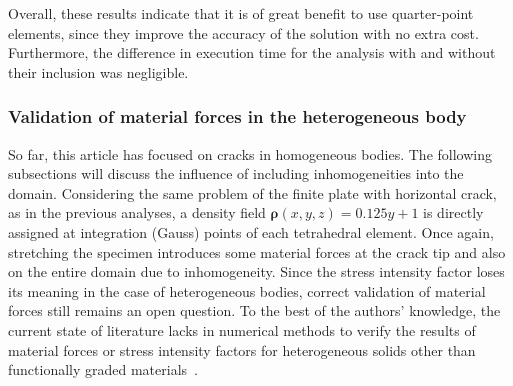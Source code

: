 \documentclass[11pt]{acmeArticle}
\numberwithin{equation}{section}
\begin{document}
Overall, these results indicate that it is of great benefit to use quarter-point elements, since they improve the accuracy of the solution with no extra cost.
Furthermore, the difference in execution time for the analysis with and without their inclusion was negligible. 
\subsubsection{Validation of material forces in the heterogeneous body}
So far, this article has focused on cracks in homogeneous bodies. 
The following subsections will discuss the influence of including inhomogeneities into the domain. 
Considering the same problem of the finite plate with horizontal crack, as in the previous analyses, a density field $\mathbf{\rho}(x,y,z) = 0.125y + 1$ is directly assigned at integration (Gauss) points of each tetrahedral element.
Once again, stretching the specimen introduces some material forces at the crack tip and also on the entire domain due to inhomogeneity. 
Since the stress intensity factor loses its meaning in the case of heterogeneous bodies, correct validation of material forces still remains an open question. 
To the best of the authors' knowledge, the current state of literature lacks in numerical methods to verify the results of material forces or stress intensity factors for heterogeneous solids other than functionally graded materials~\citep{kim2002finite}.
\end{document}
